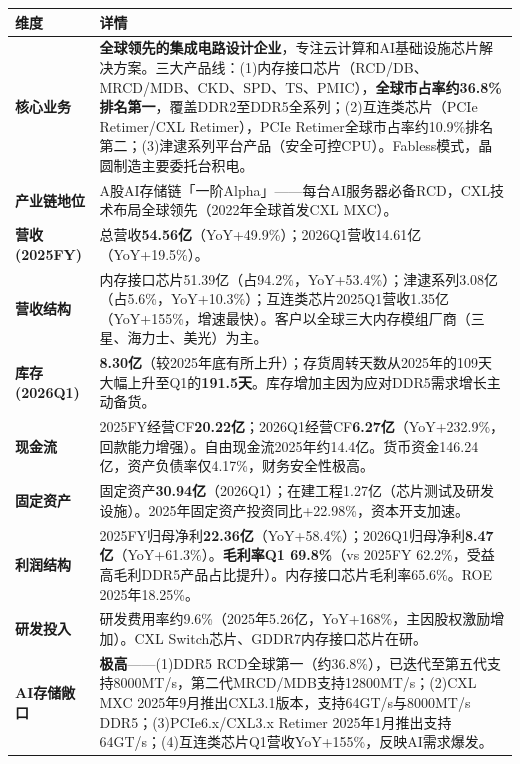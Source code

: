 \begin{exhibitbox}
\centering
\scriptsize
\renewcommand{\arraystretch}{1.20}
\begin{tabularx}{\exhibitboxwidth}{>{\bfseries}p{2.2cm} >{\raggedright\arraybackslash\sloppy\hspace{0pt}}X}
\toprule
\textbf{维度} & \textbf{详情} \\
\midrule
核心业务 & \textbf{全球领先的集成电路设计企业}，专注云计算和AI基础设施芯片解决方案。三大产品线：(1)内存接口芯片（RCD/DB、MRCD/MDB、CKD、SPD、TS、PMIC），\textbf{全球市占率约36.8\%排名第一}，覆盖DDR2至DDR5全系列；(2)互连类芯片（PCIe Retimer/CXL Retimer），PCIe Retimer全球市占率约10.9\%排名第二；(3)津逮系列平台产品（安全可控CPU）。Fabless模式，晶圆制造主要委托台积电。 \\
产业链地位 & A股AI存储链「一阶Alpha」——每台AI服务器必备RCD，CXL技术布局全球领先（2022年全球首发CXL MXC）。 \\
营收(2025FY) & 总营收\textbf{54.56亿}（YoY+49.9\%）；2026Q1营收14.61亿（YoY+19.5\%）。 \\
营收结构 & 内存接口芯片51.39亿（占94.2\%，YoY+53.4\%）；津逮系列3.08亿（占5.6\%，YoY+10.3\%）；互连类芯片2025Q1营收1.35亿（YoY+155\%，增速最快）。客户以全球三大内存模组厂商（三星、海力士、美光）为主。 \\
库存(2026Q1) & \textbf{8.30亿}（较2025年底有所上升）；存货周转天数从2025年的109天大幅上升至Q1的\textbf{191.5天}。库存增加主因为应对DDR5需求增长主动备货。 \\
现金流 & 2025FY经营CF\textbf{20.22亿}；2026Q1经营CF\textbf{6.27亿}（YoY+232.9\%，回款能力增强）。自由现金流2025年约14.4亿。货币资金146.24亿，资产负债率仅4.17\%，财务安全性极高。 \\
固定资产 & 固定资产\textbf{30.94亿}（2026Q1）；在建工程1.27亿（芯片测试及研发设施）。2025年固定资产投资同比+22.98\%，资本开支加速。 \\
利润结构 & 2025FY归母净利\textbf{22.36亿}（YoY+58.4\%）；2026Q1归母净利\textbf{8.47亿}（YoY+61.3\%）。\textbf{毛利率Q1 69.8\%}（vs 2025FY 62.2\%，受益高毛利DDR5产品占比提升）。内存接口芯片毛利率65.6\%。ROE 2025年18.25\%。 \\
研发投入 & 研发费用率约9.6\%（2025年5.26亿，YoY+168\%，主因股权激励增加）。CXL Switch芯片、GDDR7内存接口芯片在研。 \\
AI存储敞口 & \textbf{极高}——(1)DDR5 RCD全球第一（约36.8\%），已迭代至第五代支持8000MT/s，第二代MRCD/MDB支持12800MT/s；(2)CXL MXC 2025年9月推出CXL3.1版本，支持64GT/s与8000MT/s DDR5；(3)PCIe6.x/CXL3.x Retimer 2025年1月推出支持64GT/s；(4)互连类芯片Q1营收YoY+155\%，反映AI需求爆发。 \\
\bottomrule
\end{tabularx}
\end{exhibitbox}

